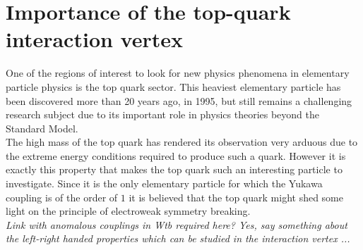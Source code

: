 \section{Importance of the top-quark interaction vertex}
One of the regions of interest to look for new physics phenomena in elementary particle physics is the top quark sector. This heaviest elementary particle has been discovered more than 20 years ago, in 1995, but still remains a challenging research subject due to its important role in physics theories beyond the Standard Model. 
\\
The high mass of the top quark has rendered its observation very arduous due to the extreme energy conditions required to produce such a quark. 
However it is exactly this property that makes the top quark such an interesting particle to investigate.
Since it is the only elementary particle for which the Yukawa coupling is of the order of $1$ it is believed that the top quark might shed some light on the principle of electroweak symmetry breaking.
\\
\textit{Link with anomalous couplings in Wtb required here? Yes, say something about the left-right handed properties which can be studied in the interaction vertex ...}
%

